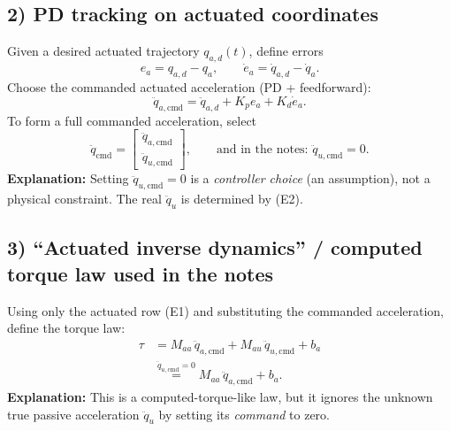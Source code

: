 \subsection*{2) PD tracking on actuated coordinates}
Given a desired actuated trajectory $q_{a,d}(t)$, define errors
\begin{equation}
e_a = q_{a,d}-q_a,
\qquad
\dot e_a = \dot q_{a,d}-\dot q_a.
\end{equation}
Choose the commanded actuated acceleration (PD + feedforward):
\begin{equation}
\ddot q_{a,\mathrm{cmd}}
=
\ddot q_{a,d} + K_p e_a + K_d \dot e_a.
\tag{C1}
\end{equation}
To form a full commanded acceleration, select
\begin{equation}
\ddot q_{\mathrm{cmd}}
=
\begin{bmatrix}
\ddot q_{a,\mathrm{cmd}}\\
\ddot q_{u,\mathrm{cmd}}
\end{bmatrix},
\qquad
\text{and in the notes: }\ddot q_{u,\mathrm{cmd}}=0.
\tag{C2}
\end{equation}
\noindent
\textbf{Explanation:} Setting $\ddot q_{u,\mathrm{cmd}}=0$ is a \emph{controller choice} (an assumption), not a physical constraint. The real $\ddot q_u$ is determined by (E2).

\subsection*{3) ``Actuated inverse dynamics'' / computed torque law used in the notes}
Using only the actuated row (E1) and substituting the commanded acceleration, define the torque law:
\begin{align}
\tau
&=
M_{aa}\,\ddot q_{a,\mathrm{cmd}} + M_{au}\,\ddot q_{u,\mathrm{cmd}} + b_a
\nonumber\\
&\overset{\ddot q_{u,\mathrm{cmd}}=0}{=}
M_{aa}\,\ddot q_{a,\mathrm{cmd}} + b_a.
\tag{T}
\end{align}
\noindent
\textbf{Explanation:} This is a computed-torque-like law, but it ignores the unknown true passive acceleration $\ddot q_u$ by setting its \emph{command} to zero.

